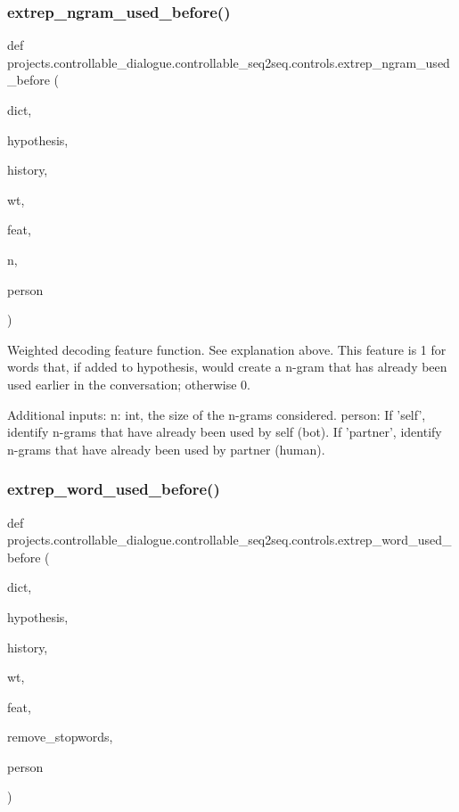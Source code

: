 \subsubsection{\texorpdfstring{extrep\+\_\+ngram\+\_\+used\+\_\+before()}{extrep\_ngram\_used\_before()}}
{\footnotesize\ttfamily def projects.\+controllable\+\_\+dialogue.\+controllable\+\_\+seq2seq.\+controls.\+extrep\+\_\+ngram\+\_\+used\+\_\+before (\begin{DoxyParamCaption}\item[{}]{dict,  }\item[{}]{hypothesis,  }\item[{}]{history,  }\item[{}]{wt,  }\item[{}]{feat,  }\item[{}]{n,  }\item[{}]{person }\end{DoxyParamCaption})}

\begin{DoxyVerb}Weighted decoding feature function. See explanation above. This feature is 1 for
words that, if added to hypothesis, would create a n-gram that has already been used
earlier in the conversation; otherwise 0.

Additional inputs:
  n: int, the size of the n-grams considered.
  person: If 'self', identify n-grams that have already been used by self (bot).
    If 'partner', identify n-grams that have already been used by partner (human).
\end{DoxyVerb}
 \mbox{\label{namespaceprojects_1_1controllable__dialogue_1_1controllable__seq2seq_1_1controls_a1d20bea2946cab3a79aa8a2e77f9e09b}} 
\subsubsection{\texorpdfstring{extrep\+\_\+word\+\_\+used\+\_\+before()}{extrep\_word\_used\_before()}}
{\footnotesize\ttfamily def projects.\+controllable\+\_\+dialogue.\+controllable\+\_\+seq2seq.\+controls.\+extrep\+\_\+word\+\_\+used\+\_\+before (\begin{DoxyParamCaption}\item[{}]{dict,  }\item[{}]{hypothesis,  }\item[{}]{history,  }\item[{}]{wt,  }\item[{}]{feat,  }\item[{}]{remove\+\_\+stopwords,  }\item[{}]{person }\end{DoxyParamCaption})}

